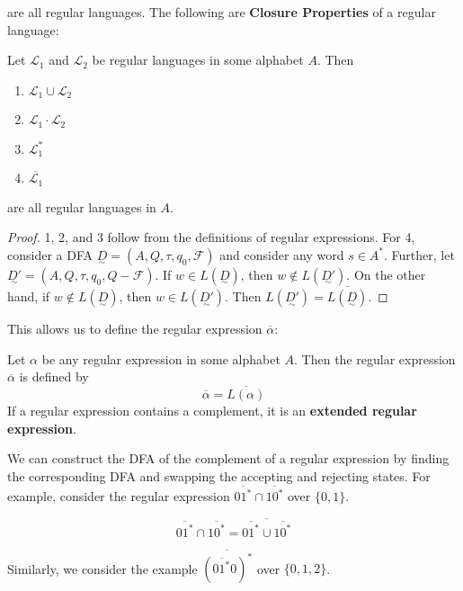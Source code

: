 are all regular languages. The following are \textbf{Closure Properties} of a regular language:

\begin{theorem}
      Let \(\mathcal{L_1}\) and \(\mathcal{L_2}\) be regular languages in some alphabet \(A\). Then
      \begin{enumerate}[1)]
            \item \(\mathcal{L}_1\cup\mathcal{L}_2\)
            \item \(\mathcal{L}_1\cdot \mathcal{L}_2\)
            \item \(\mathcal{L}_1^*\)
            \item \(\overline{\mathcal{L}_1}\)
      \end{enumerate}

      are all regular languages in \(A\).
\end{theorem}

\begin{proof}
      1, 2, and 3 follow from the definitions of regular expressions. For 4, consider a DFA \(\underset{\sim}{D}=(A, Q, \tau, q_0, \mathcal{F})\) and consider any word \(s\in A^*\). Further, let \(\underset{\sim}{D'}=(A, Q, \tau, q_0, Q-\mathcal{F})\). If \(w\in L(\underset{\sim}{D})\), then \(w\not\in L(\underset{\sim}{D'})\). On the other hand, if \(w\not\in L(\underset{\sim}{D})\), then \(w\in L(\underset{\sim}{D'})\). Then \(L(\underset{\sim}{D'})=\overline{L(\underset{\sim}{D})}\).
\end{proof}

This allows us to define the regular expression \(\overline{\alpha}\):

\begin{definition}
      Let \(\alpha\) be any regular expression in some alphabet \(A\). Then the regular expression \(\overline{\alpha}\) is defined by \[\overline{\alpha}=\overline{L(\alpha)}\] If a regular expression contains a complement, it is an \textbf{extended regular expression}.
\end{definition}

We can construct the DFA of the complement of a regular expression by finding the corresponding DFA and swapping the accepting and rejecting states. For example, consider the regular expression \(\overline{01^*}\cap\overline{10^*}\) over \(\{0, 1\}\). 

\[\overline{01^*}\cap\overline{10^*}=\overline{\overline{01^*}\cup\overline{10^*}}\]

Similarly, we consider the example \(\overline{(\overline{01^*}0)^*}\) over \(\{0,1,2\}\).

